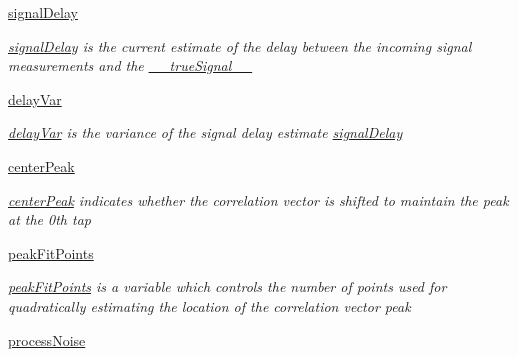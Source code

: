 \begin{DoxyCompactItemize}
\hyperlink{classmodest_1_1substates_1_1correlationvector_1_1CorrelationVector_aa1565b9972d60149f335e3b923cac371}{signal\+Delay}
\begin{DoxyCompactList}\small\item\em \hyperlink{classmodest_1_1substates_1_1correlationvector_1_1CorrelationVector_aa1565b9972d60149f335e3b923cac371}{signal\+Delay} is the current estimate of the delay between the incoming signal measurements and the \hyperlink{classmodest_1_1substates_1_1correlationvector_1_1CorrelationVector_af2f52cea1c695f36dd100f529c322e94}{\+\_\+\+\_\+true\+Signal\+\_\+\+\_\+} \end{DoxyCompactList}\item 
\hyperlink{classmodest_1_1substates_1_1correlationvector_1_1CorrelationVector_ab0c6ffbea793ae20593e85d033341595}{delay\+Var}
\begin{DoxyCompactList}\small\item\em \hyperlink{classmodest_1_1substates_1_1correlationvector_1_1CorrelationVector_ab0c6ffbea793ae20593e85d033341595}{delay\+Var} is the variance of the signal delay estimate \hyperlink{classmodest_1_1substates_1_1correlationvector_1_1CorrelationVector_aa1565b9972d60149f335e3b923cac371}{signal\+Delay} \end{DoxyCompactList}\item 
\hyperlink{classmodest_1_1substates_1_1correlationvector_1_1CorrelationVector_a9dbc1cdcfab963b133537b54f0a6d7a6}{center\+Peak}
\begin{DoxyCompactList}\small\item\em \hyperlink{classmodest_1_1substates_1_1correlationvector_1_1CorrelationVector_a9dbc1cdcfab963b133537b54f0a6d7a6}{center\+Peak} indicates whether the correlation vector is shifted to maintain the peak at the 0th tap \end{DoxyCompactList}\item 
\hyperlink{classmodest_1_1substates_1_1correlationvector_1_1CorrelationVector_af2be8d7129fd0453208af5268fdddc22}{peak\+Fit\+Points}
\begin{DoxyCompactList}\small\item\em \hyperlink{classmodest_1_1substates_1_1correlationvector_1_1CorrelationVector_af2be8d7129fd0453208af5268fdddc22}{peak\+Fit\+Points} is a variable which controls the number of points used for quadratically estimating the location of the correlation vector peak \end{DoxyCompactList}\item 
\hyperlink{classmodest_1_1substates_1_1correlationvector_1_1CorrelationVector_ab1756128cdec161ea22557d756745195}{process\+Noise}

\end{DoxyCompactItemize}
